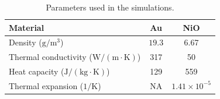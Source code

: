 \documentclass[aps,prl,reprint,floatfix,longbibliography,twocolumn]{revtex4-2}
\begin{document}
\begin{table}[h!]
\centering
\caption{Parameters used in the simulations.}
\begin{tabular}{l|c|c}
    \hline
    \hline
  Material & Au &NiO  \\
  \hline
   Density ($\mathrm{g/m^3}$) &$19.3$&6.67 \\
   Thermal conductivity ($\mathrm{W/(m\cdot K)}$) & 317 &50\\
   Heat capacity ($\mathrm{J/(kg\cdot K)}$) & 129 &559\\
   Thermal expansion ($\mathrm{1/K}$) &NA&$1.41\times 10^{-5}$\\
\hline
\end{tabular}
\label{tab2}
\end{table}
\end{document}
